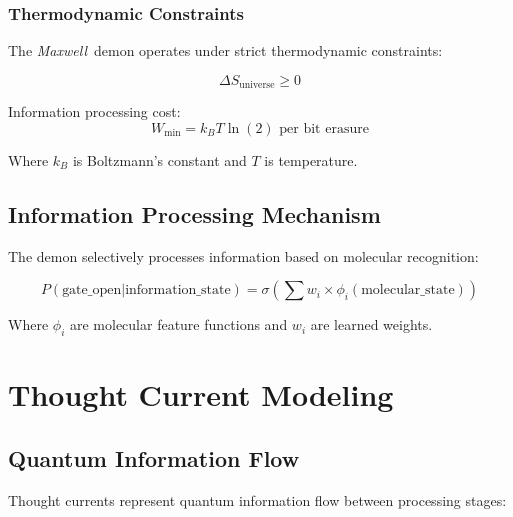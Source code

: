 \documentclass[11pt,a4paper]{article}
\newcommand{\maxwell}{\textit{Maxwell}}
\begin{document}
\subsubsection{Thermodynamic Constraints}

The \maxwell\ demon operates under strict thermodynamic constraints:

\begin{equation}
\Delta S_{\text{universe}} \geq 0
\end{equation}

Information processing cost:
\begin{equation}
W_{\text{min}} = k_B T \ln(2) \text{ per bit erasure}
\end{equation}

Where $k_B$ is Boltzmann's constant and $T$ is temperature.

\subsection{Information Processing Mechanism}

The demon selectively processes information based on molecular recognition:

\begin{equation}
P(\text{gate\_open}|\text{information\_state}) = \sigma\left(\sum w_i \times \phi_i(\text{molecular\_state})\right)
\end{equation}

Where $\phi_i$ are molecular feature functions and $w_i$ are learned weights.

\section{Thought Current Modeling}

\subsection{Quantum Information Flow}

Thought currents represent quantum information flow between processing stages:
\end{document}
